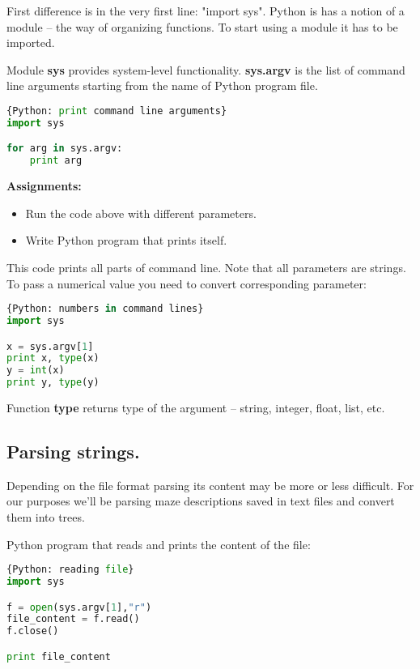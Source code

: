 First difference is in the very first line: "import sys".
Python is has a notion of a module -- the way of organizing
functions. To start using a module it has to be imported.

Module \textbf{sys} provides system-level functionality.
\textbf{sys.argv} is the list of command line arguments starting
from the name of Python program file.

\begin{lstlisting}[language=Python,style=codelst]{Python: print command line arguments}
import sys

for arg in sys.argv:
    print arg
\end{lstlisting}

\begin{tcolorbox}
\textbf{Assignments:}
\begin{itemize}
\item Run the code above with different parameters.
\item Write Python program that prints itself.
\end{itemize}
\end{tcolorbox}

This code prints all parts of command line. Note that all parameters are strings.
To pass a numerical value you need to convert corresponding parameter:

\begin{lstlisting}[language=Python,style=codelst]{Python: numbers in command lines}
import sys

x = sys.argv[1]
print x, type(x)
y = int(x)
print y, type(y)
\end{lstlisting}

Function \textbf{type} returns type of the argument --
string, integer, float, list, etc.


\subsection{Parsing strings.}

Depending on the file format parsing its content 
may be more or less difficult.
For our purposes we'll be parsing maze descriptions 
saved in text files and convert
them into trees.

Python program that reads and prints the content of the file:

\begin{lstlisting}[language=Python,style=codelst]{Python: reading file}
import sys

f = open(sys.argv[1],"r")
file_content = f.read()
f.close()

print file_content
\end{lstlisting}

